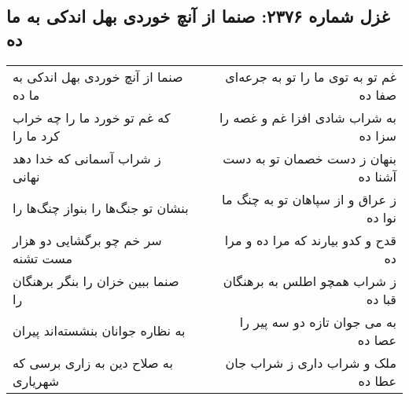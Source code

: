 \begin{center}
\section*{غزل شماره ۲۳۷۶: صنما از آنچ خوردی بهل اندکی به ما ده}
\label{sec:2376}
\begin{longtable}{l p{0.5cm} r}
صنما از آنچ خوردی بهل اندکی به ما ده
&&
غم تو به توی ما را تو به جرعه‌ای صفا ده
\\
که غم تو خورد ما را چه خراب کرد ما را
&&
به شراب شادی افزا غم و غصه را سزا ده
\\
ز شراب آسمانی که خدا دهد نهانی
&&
بنهان ز دست خصمان تو به دست آشنا ده
\\
بنشان تو جنگ‌ها را بنواز چنگ‌ها را
&&
ز عراق و از سپاهان تو به چنگ ما نوا ده
\\
سر خم چو برگشایی دو هزار مست تشنه
&&
قدح و کدو بیارند که مرا ده و مرا ده
\\
صنما ببین خزان را بنگر برهنگان را
&&
ز شراب همچو اطلس به برهنگان قبا ده
\\
به نظاره جوانان بنشسته‌اند پیران
&&
به می جوان تازه دو سه پیر را عصا ده
\\
به صلاح دین به زاری برسی که شهریاری
&&
ملک و شراب داری ز شراب جان عطا ده
\\
\end{longtable}
\end{center}
